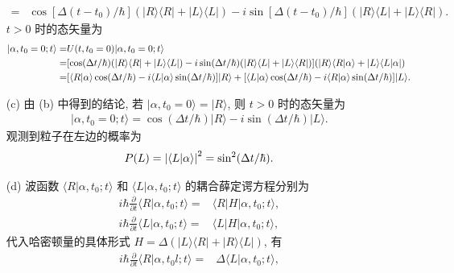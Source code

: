 \documentclass{assignment}
\begin{document}
\begin{sol}
\begin{itemize}
\begin{align}
            =&\cos[\Delta(t-t_0)/\hbar](\lvert R\rangle\langle R\rvert+\lvert L\rangle\langle L\rvert)-i\sin[\Delta(t-t_0)/\hbar](\lvert R\rangle\langle L\rvert+\lvert L\rangle\langle R\rvert).
        \end{align}
        $t>0$ 时的态矢量为
        \begin{align}
            \notag\lvert\alpha,t_0=0;t\rangle=&U(t,t_0=0)\lvert\alpha,t_0=0;t\rangle\\
            \notag=&[\cos(\Delta t/\hbar)(\lvert R\rangle\langle R\rvert+\lvert L\rangle\langle L\rvert)-i\sin(\Delta t/\hbar)(\lvert R\rangle\langle L\rvert+\lvert L\rangle\langle R\rvert)](\lvert R\rangle\langle R\vert\alpha\rangle+\lvert L\rangle\langle L\vert\alpha\rvert)\\
            =&[\langle R\vert\alpha\rangle\cos(\Delta t/\hbar)-i\langle L\vert\alpha\rangle\sin(\Delta t/\hbar)]\lvert R\rangle+[\langle L\vert\alpha\rangle\cos(\Delta t/\hbar)-i\langle R\vert\alpha\rangle\sin(\Delta t/\hbar)]\lvert L\rangle.
        \end{align}
        \item[(c)] 由 (b) 中得到的结论, 若 $\lvert\alpha,t_0=0\rangle=\lvert R\rangle$, 则 $t>0$ 时的态矢量为
        \begin{align}
            \lvert\alpha,t_0=0;t\rangle=\cos(\Delta t/\hbar)\lvert R\rangle-i\sin(\Delta t/\hbar)\lvert L\rangle.
        \end{align}
        观测到粒子在左边的概率为
        \begin{align}
            P(L)=\left\lvert\langle L\vert\alpha\rangle\right\rvert^2=\sin^2(\Delta t/\hbar).
        \end{align}
        \item[(d)] 波函数 $\langle R\vert\alpha,t_0;t\rangle$ 和 $\langle L\vert\alpha,t_0;t\rangle$ 的耦合薛定谔方程分别为
        \begin{align}
            i\hbar\frac{\partial}{\partial t}\langle R\vert\alpha,t_0;t\rangle=&\langle R\rvert H\lvert\alpha,t_0;t\rangle,\\
            i\hbar\frac{\partial}{\partial t}\langle L\vert\alpha,t_0;t\rangle=&\langle L\rvert H\lvert\alpha,t_0;t\rangle,
        \end{align}
        代入哈密顿量的具体形式 $H=\Delta(\lvert L\rangle\langle R\rvert+\lvert R\rangle\langle L\rvert)$, 有
        \begin{align}
            i\hbar\frac{\partial}{\partial t}\langle R\vert\alpha,t_0l;t\rangle=&\Delta\langle L\vert\alpha,t_0;t\rangle,\\

\end{align}
\end{itemize}
\end{sol}
\end{document}

